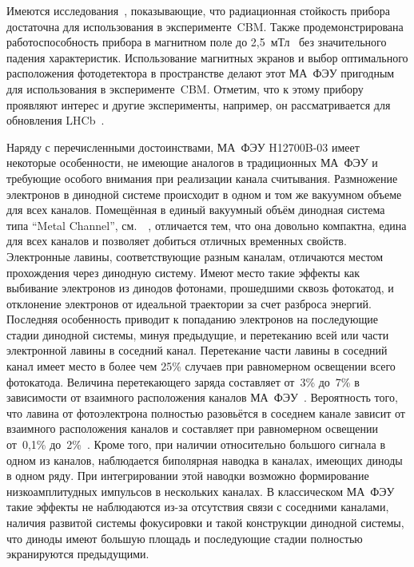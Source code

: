 Имеются исследования~\cite{MAPMTRADHARD, THECBMRICHPROJ16, THECBMRICHDET16}, показывающие, что радиационная стойкость прибора достаточна для использования в эксперименте~CBM. Также продемонстрирована работоспособность прибора в магнитном поле до 2,5~мТл~\cite{CALVI} без значительного падения характеристик. Использование магнитных экранов и выбор оптимального расположения фотодетектора в пространстве делают этот МА~ФЭУ пригодным для использования в эксперименте~CBM. Отметим, что к этому прибору проявляют интерес и другие эксперименты, например, он рассматривается для обновления LHCb~\cite{CALVI}.

Наряду с перечисленными достоинствами, МА~ФЭУ H12700B-03 имеет некоторые особенности, не имеющие аналогов в традиционных МА~ФЭУ и требующие особого внимания при реализации канала считывания. Размножение электронов в динодной системе происходит в одном и том же вакуумном объеме для всех каналов. Помещённая в единый вакуумный объём динодная система типа ``Metal Channel'', см.~~\cite{MCdynodeSys}, отличается тем, что она довольно компактна, едина для всех каналов и позволяет добиться отличных временных свойств. Электронные лавины, соответствующие разным каналам, отличаются местом прохождения через динодную систему. Имеют место такие эффекты как выбивание электронов из динодов фотонами, прошедшими сквозь фотокатод, и отклонение электронов от идеальной траектории за счет разброса энергий. Последняя особенность приводит к попаданию электронов на последующие стадии динодной системы, минуя предыдущие, и перетеканию всей или части электронной лавины в соседний канал. Перетекание части лавины в соседний канал имеет место в более чем 25\% случаев при равномерном освещении всего фотокатода. Величина перетекающего заряда составляет от~3\% до~7\% в зависимости от взаимного расположения каналов МА~ФЭУ~\cite{CALVI}. Вероятность того, что лавина от фотоэлектрона полностью разовьётся в соседнем канале зависит от взаимного расположения каналов и составляет при равномерном освещении от~0,1\% до~2\%~\cite{KOPFERDISS}. Кроме того, при наличии относительно большого сигнала в одном из каналов, наблюдается биполярная наводка в каналах, имеющих диноды в одном ряду. При интегрировании этой наводки возможно формирование низкоамплитудных импульсов в нескольких каналах. В классическом МА~ФЭУ такие эффекты не наблюдаются из-за отсутствия связи с соседними каналами, наличия развитой системы фокусировки и такой конструкции динодной системы, что диноды имеют большую площадь и последующие стадии полностью экранируются предыдущими.

